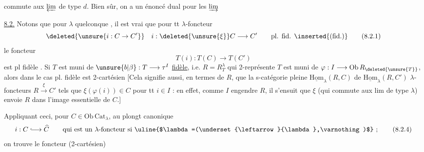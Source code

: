 commute aux $\varprojlim$ de type $d$. Bien sûr, on a un
énoncé dual pour les $\varinjlim$

\uline{8.2.} Notons que pour  $\lambda$ quelconque , il est vrai que pour
tt $\lambda$-foncteur 
\[
\deleted{\unsure{i:C\to C'}}\quad i:\deleted{\unsure{\xi}}C\longrightarrow C'\qquad\text{pl. fid. \inserted{(fid.)}}\tag*{(8.2.1)}
\]
le foncteur
\[
T(i):T(C)\longrightarrow T(C')\tag*{(8.2.2)}
\]
est pl fidèle . Si $T$ est muni de $\unsure{b|\beta}:T\longrightarrow\tau^I$ 
\uline{fidèle}, i.e. $R=R_T^\lambda$ qui 2-représente $T$ est muni de
$\varphi:I\longrightarrow\mathrm{Ob}\,R_{\deleted{\unsure{T}}}$, alors  dans le cas pl. fidèle
est 2-cartésien [Cela signifie aussi, en termes de $R$,
que la s-catégorie pleine  $\underline{\mathrm{Hom}}_\lambda(R,C)$ de $\underline{\mathrm{Hom}}_\lambda(R,C')$
 $\lambda$-foncteurs $R\xrightarrow{\xi}C'$ tels que $\xi(\varphi(i))\in C$
pour tt $i\in I$ : en effet, comme $I$ \inserted{$\lambda$-}engendre $R$, il
s'ensuit que $\xi$ (qui commute aux lim de type $\lambda$)
envoie $R$ dans l'image essentielle de $C$.]

Appliquant ceci, pour $C\in\mathrm{Ob}\,\mathrm{Cat}_\lambda$, au plongt
canonique
\[
i:C\lhook\joinrel\longrightarrow\widehat C\qquad\text{qui est un $\lambda$-foncteur si }\uline{$\lambda=(\underset{\leftarrow}{\lambda},\varnothing)$}\ ;\tag*{(8.2.4)}
\]
on trouve  le foncteur
(2-cartésien)

